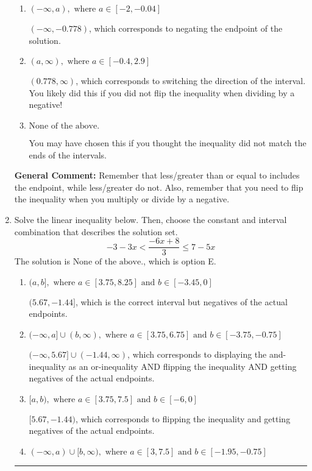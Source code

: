\documentclass{extbook}[14pt]
\newcommand{\litem}[1]{\item #1

\rule{\textwidth}{0.4pt}}
\begin{document}
\begin{enumerate}
{\begin{enumerate}[label=\Alph*.]
 $(-0.778, \infty)$, which corresponds to switching the direction of the interval AND negating the endpoint. You likely did this if you did not flip the inequality when dividing by a negative as well as not moving values over to a side properly.
\item \( (-\infty, a), \text{ where } a \in [-2, -0.04] \)

 $(-\infty, -0.778)$, which corresponds to negating the endpoint of the solution.
\item \( (a, \infty), \text{ where } a \in [-0.4, 2.9] \)

 $(0.778, \infty)$, which corresponds to switching the direction of the interval. You likely did this if you did not flip the inequality when dividing by a negative!
\item \( \text{None of the above}. \)

You may have chosen this if you thought the inequality did not match the ends of the intervals.
\end{enumerate}

\textbf{General Comment:} Remember that less/greater than or equal to includes the endpoint, while less/greater do not. Also, remember that you need to flip the inequality when you multiply or divide by a negative.
}
\litem{
Solve the linear inequality below. Then, choose the constant and interval combination that describes the solution set.
\[ -3 - 3 x < \frac{-6 x + 8}{3} \leq 7 - 5 x \]The solution is \( \text{None of the above.} \), which is option E.\begin{enumerate}[label=\Alph*.]
\item \( (a, b], \text{ where } a \in [3.75, 8.25] \text{ and } b \in [-3.45, 0] \)

$(5.67, -1.44]$, which is the correct interval but negatives of the actual endpoints.
\item \( (-\infty, a] \cup (b, \infty), \text{ where } a \in [3.75, 6.75] \text{ and } b \in [-3.75, -0.75] \)

$(-\infty, 5.67] \cup (-1.44, \infty)$, which corresponds to displaying the and-inequality as an or-inequality AND flipping the inequality AND getting negatives of the actual endpoints.
\item \( [a, b), \text{ where } a \in [3.75, 7.5] \text{ and } b \in [-6, 0] \)

$[5.67, -1.44)$, which corresponds to flipping the inequality and getting negatives of the actual endpoints.
\item \( (-\infty, a) \cup [b, \infty), \text{ where } a \in [3, 7.5] \text{ and } b \in [-1.95, -0.75] \)


\end{enumerate}}
\end{enumerate}
\end{document}
